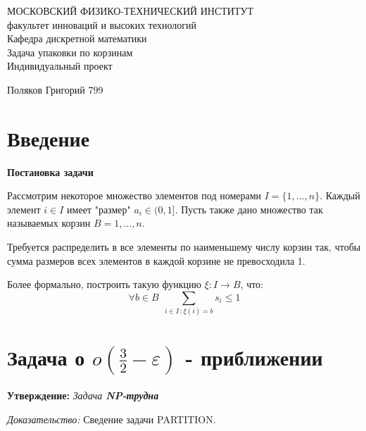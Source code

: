 \documentclass[a4paper,14pt,russian]{article}
\begin{document}
\begin{center}
\hfill \break
\large{МОСКОВСКИЙ ФИЗИКО-ТЕХНИЧЕСКИЙ ИНСТИТУТ}\\
\hfill \break
\normalsize{факультет инноваций и высоких технологий}\\
 \hfill \break
\normalsize{Кафедра дискретной математики}\\
\hfill\break
\hfill \break
\hfill \break
\hfill \break
\vfill
\Large{Задача упаковки по корзинам}\\
\hfill \break
\hfill \break
\large{Индивидуальный проект}

\hfill \break
\hfill \break

\end{center}
 
\hfill \break
\vfill

\hfill
\large{Поляков Григорий 799}
\break


\thispagestyle{empty} 
 
 
\newpage
     
\newpage
 
\newpage
\section{Введение}

{\large \bf Постановка задачи}

Рассмотрим некоторое множество элементов под номерами $I = \{1, ..., n\}$. Каждый элемент $i \in I$ имеет "размер" $a_i \in (0, 1]$. Пусть также дано множество так называемых корзин $B = {1, ..., n}$. 

Требуется распределить в все элементы по наименьшему числу корзин так, чтобы сумма размеров всех элементов в каждой корзине не превосходила 1.

Более формально, построить такую функцию $\xi : I \rightarrow B$, что: $$\forall b \in B \:\: \sum_{i \in I \: : \xi(i) = b} s_i \leq 1$$

\newpage
\section {Задача о $o(\frac{3}{2} - \varepsilon)$ - приближении}

{\bf Утверждение:} \textit{Задача \bf{NP}-трудна}

\textit{Доказательство:} Сведение задачи PARTITION.
\end{document}
